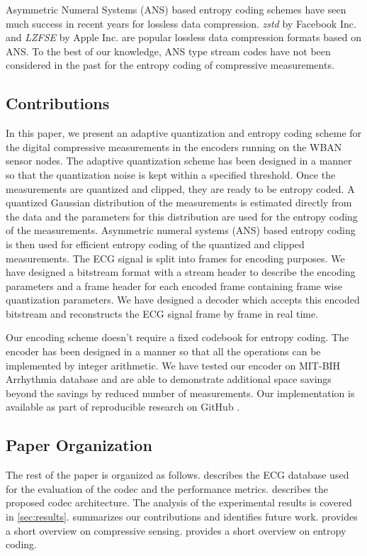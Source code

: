  Asymmetric Numeral Systems (ANS) \cite{duda2013asymmetric}
 based entropy coding schemes have seen much success
 in recent years for lossless data compression.
 \emph{zstd} by Facebook Inc. \cite{zstd}
 and \emph{LZFSE} by Apple Inc. are popular lossless
 data compression formats based on ANS.
 To the best of our knowledge, ANS type stream codes
 have not been considered in the past for the entropy
 coding of compressive measurements.


\subsection{Contributions}
In this paper, we present an adaptive quantization and
entropy coding scheme for the digital compressive measurements
in the encoders running on the WBAN sensor nodes.
The adaptive quantization scheme has been designed in a manner
so that the quantization noise is kept within a specified
threshold. Once the measurements are quantized and clipped,
they are ready to be entropy coded. A quantized Gaussian
distribution of the measurements is estimated directly from
the data and the parameters for this distribution are used
for the entropy coding of the measurements.  
Asymmetric numeral systems (ANS) based
entropy coding is then used for efficient entropy coding
of the quantized and clipped measurements.
The ECG signal is split into frames for encoding purposes.
We have designed a bitstream format with a stream header
to describe the encoding parameters and a frame header
for each encoded frame containing frame wise quantization
parameters. We have designed a decoder which accepts this
encoded bitstream and reconstructs the ECG signal frame by
frame in real time. 

Our encoding scheme doesn't require a fixed codebook
for entropy coding. The encoder has been
designed in a manner so that all the operations can
be implemented by integer arithmetic. We have
tested our encoder on MIT-BIH Arrhythmia database
and are able to demonstrate additional space savings
beyond the savings by reduced number of measurements.
Our implementation is available as part of
reproducible research on GitHub \cite{kumar2022ecgcodec}.

\subsection{Paper Organization}
The rest of the paper is organized as follows.
 describes the ECG database
used for the evaluation of the codec and the
performance metrics.
 describes the proposed codec architecture.
The analysis of the experimental results is covered in \cref{sec:results}.
 summarizes our contributions and
identifies future work.
 provides a short overview on
compressive sensing.
 provides a short overview on
entropy coding.

